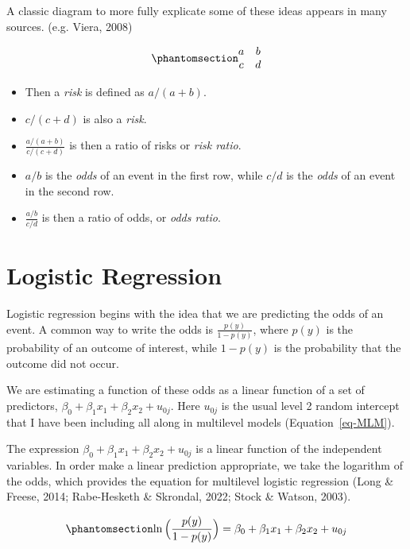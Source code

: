 \documentclass[
  letterpaper,
  DIV=11,
  numbers=noendperiod]{scrreprt}
\begin{document}
A classic diagram to more fully explicate some of these ideas appears in
many sources. (e.g. Viera, 2008)

\begin{equation}\phantomsection\label{eq-event-matrix}{\begin{matrix}
a & b \\
c & d 
\end{matrix}}\end{equation}

\begin{itemize}
\item
  Then a \emph{risk} is defined as \(a/(a + b)\).
\item
  \(c/(c + d)\) is also a \emph{risk}.
\item
  \(\frac{a/(a + b)}{c/(c + d)}\) is then a ratio of risks or \emph{risk
  ratio}.
\item
  \(a/b\) is the \emph{odds} of an event in the first row, while \(c/d\)
  is the \emph{odds} of an event in the second row.
\item
  \(\frac{a/b}{c/d}\) is then a ratio of odds, or \emph{odds ratio}.
\end{itemize}

\section{Logistic Regression}\label{logistic-regression}

Logistic regression begins with the idea that we are predicting the odds
of an event. A common way to write the odds is \(\frac{p(y)}{1-p(y)}\),
where \(p(y)\) is the probability of an outcome of interest, while
\(1-p(y)\) is the probability that the outcome did not occur.

We are estimating a function of these odds as a linear function of a set
of predictors, \(\beta_0 + \beta_1 x_1 + \beta_2 x_2 + u_{0j}\). Here
\(u_{0j}\) is the usual level 2 random intercept that I have been
including all along in multilevel models (Equation~\ref{eq-MLM}).

The expression \(\beta_0 + \beta_1 x_1 + \beta_2 x_2 + u_{0j}\) is a
linear function of the independent variables. In order make a linear
prediction appropriate, we take the logarithm of the odds, which
provides the equation for multilevel logistic regression (Long \&
Freese, 2014; Rabe-Hesketh \& Skrondal, 2022; Stock \& Watson, 2003).

\begin{equation}\phantomsection\label{eq-logistic-MLM}{\ln\Big(\frac{p(y)}{1-p(y)}\Big) = \beta_0 + \beta_1 x_1 + \beta_2 x_2 + u_{0j}}\end{equation}
\end{document}
